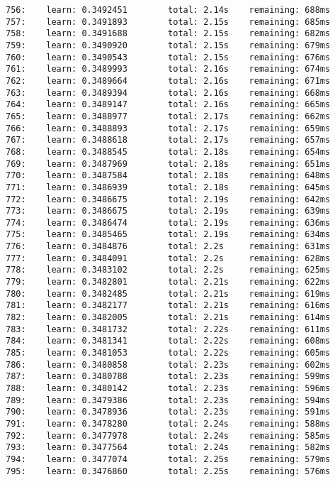 \documentclass[11pt]{article}
\begin{document}
\begin{Verbatim}[commandchars=\\\{\}]
756:    learn: 0.3492451        total: 2.14s    remaining: 688ms
757:    learn: 0.3491893        total: 2.15s    remaining: 685ms
758:    learn: 0.3491688        total: 2.15s    remaining: 682ms
759:    learn: 0.3490920        total: 2.15s    remaining: 679ms
760:    learn: 0.3490543        total: 2.15s    remaining: 676ms
761:    learn: 0.3489993        total: 2.16s    remaining: 674ms
762:    learn: 0.3489664        total: 2.16s    remaining: 671ms
763:    learn: 0.3489394        total: 2.16s    remaining: 668ms
764:    learn: 0.3489147        total: 2.16s    remaining: 665ms
765:    learn: 0.3488977        total: 2.17s    remaining: 662ms
766:    learn: 0.3488893        total: 2.17s    remaining: 659ms
767:    learn: 0.3488618        total: 2.17s    remaining: 657ms
768:    learn: 0.3488545        total: 2.18s    remaining: 654ms
769:    learn: 0.3487969        total: 2.18s    remaining: 651ms
770:    learn: 0.3487584        total: 2.18s    remaining: 648ms
771:    learn: 0.3486939        total: 2.18s    remaining: 645ms
772:    learn: 0.3486675        total: 2.19s    remaining: 642ms
773:    learn: 0.3486675        total: 2.19s    remaining: 639ms
774:    learn: 0.3486474        total: 2.19s    remaining: 636ms
775:    learn: 0.3485465        total: 2.19s    remaining: 634ms
776:    learn: 0.3484876        total: 2.2s     remaining: 631ms
777:    learn: 0.3484091        total: 2.2s     remaining: 628ms
778:    learn: 0.3483102        total: 2.2s     remaining: 625ms
779:    learn: 0.3482801        total: 2.21s    remaining: 622ms
780:    learn: 0.3482485        total: 2.21s    remaining: 619ms
781:    learn: 0.3482177        total: 2.21s    remaining: 616ms
782:    learn: 0.3482005        total: 2.21s    remaining: 614ms
783:    learn: 0.3481732        total: 2.22s    remaining: 611ms
784:    learn: 0.3481341        total: 2.22s    remaining: 608ms
785:    learn: 0.3481053        total: 2.22s    remaining: 605ms
786:    learn: 0.3480858        total: 2.23s    remaining: 602ms
787:    learn: 0.3480788        total: 2.23s    remaining: 599ms
788:    learn: 0.3480142        total: 2.23s    remaining: 596ms
789:    learn: 0.3479386        total: 2.23s    remaining: 594ms
790:    learn: 0.3478936        total: 2.23s    remaining: 591ms
791:    learn: 0.3478280        total: 2.24s    remaining: 588ms
792:    learn: 0.3477978        total: 2.24s    remaining: 585ms
793:    learn: 0.3477564        total: 2.24s    remaining: 582ms
794:    learn: 0.3477074        total: 2.25s    remaining: 579ms
795:    learn: 0.3476860        total: 2.25s    remaining: 576ms

\end{Verbatim}
\end{document}
